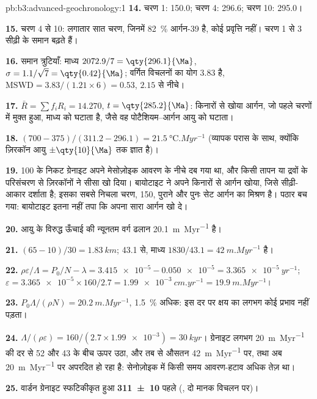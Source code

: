\begin{solution}{pb:b3:advanced-geochronology:1}
\textbf{14.} चरण 1: \qty{150.0}{\Ma}; चरण 4: \qty{296.6}{\Ma}; चरण 10:
\qty{295.0}{\Ma}।

\textbf{15.} चरण 4 से 10: लगातार सात चरण, जिनमें \qty{82}{\percent}
आर्गन-39 है, कोई प्रवृत्ति नहीं। चरण 1 से 3 सीढ़ी के समान बढ़ते हैं।

\textbf{16.} समान त्रुटियाँ: माध्य $2072.9/7 = \qty{296.1}{\Ma}$, $\sigma =
1.1/\sqrt7 = \qty{0.42}{\Ma}$; वर्गित विचलनों का योग $3.83$ है,
$\mathrm{MSWD} = 3.83/(1.21\times6) = 0.53$, $2.15$ से नीचे।

\textbf{17.} $\bar R = \sum f_iR_i = 14.270$, $t = \qty{285.2}{\Ma}$:
किनारों से खोया आर्गन, जो पहले चरणों में मुक्त हुआ, माध्य को घटाता है,
जैसे वह पोटैशियम--आर्गन आयु को घटाता।

\textbf{18.} $(700 - 375)/(311.2 - 296.1) = \qty{21.5}{\celsius.Myr^{-1}}$
(व्यापक परास के साथ, क्योंकि ज़िरकॉन आयु $\pm\qty{10}{\Ma}$ तक ज्ञात है)।

\textbf{19.} \qty{100}{\Ma} के निकट ग्रेनाइट अपने मेसोज़ोइक
आवरण के नीचे दब गया था, और किसी तापन या द्रवों के परिसंचरण से ज़िरकॉनों ने सीसा खो दिया।
बायोटाइट ने अपने किनारों से आर्गन खोया, जिसे सीढ़ी-आकार दर्शाता है; इसका
सबसे निचला चरण, \qty{150}{\Ma}, पुराने और पुनः सेट आर्गन का मिश्रण है। पठार
बच गया: बायोटाइट इतना नहीं तपा कि अपना सारा आर्गन खो दे।

\textbf{20.} आयु के विरुद्ध ऊँचाई की न्यूनतम वर्ग ढलान
\qty{20.1}{m.Myr^{-1}} है।

\textbf{21.} $(65 - 10)/30 = \qty{1.83}{km}$; \qty{43.1}{\Ma} से, माध्य
$1830/43.1 = \qty{42}{m.Myr^{-1}}$ है।

\textbf{22.} $\rho\varepsilon/\Lambda = P_0/N - \lambda = \num{3.415e-5} -
\num{0.050e-5} = \qty{3.365e-5}{yr^{-1}}$; $\varepsilon = \num{3.365e-5}\times
160/2.7 = \qty{1.99e-3}{cm.yr^{-1}} = \qty{19.9}{m.Myr^{-1}}$।

\textbf{23.} $P_0\Lambda/(\rho N) = \qty{20.2}{m.Myr^{-1}}$, \qty{1.5}{\percent}
अधिक: इस दर पर क्षय का लगभग कोई प्रभाव नहीं पड़ता।

\textbf{24.} $\Lambda/(\rho\varepsilon) = 160/(2.7\times\num{1.99e-3}) =
\qty{30}{kyr}$। ग्रेनाइट लगभग \qty{20}{m.Myr^{-1}} की दर से 52 और
\qty{43}{\Ma} के बीच ऊपर उठा, और तब से औसतन \qty{42}{m.Myr^{-1}} पर, तथा अब
\qty{20}{m.Myr^{-1}} पर अपरदित हो रहा है: सेनोज़ोइक में किसी समय
आवरण-हटाव अधिक तेज़ था।

\textbf{25.} वार्डन ग्रेनाइट स्फटिकीकृत हुआ
\textbf{\qty[text-series-to-math=true, separate-uncertainty=true]{311 \pm 10}{\Ma}} पहले (,
दो मानक विचलन पर)।
\end{solution}

